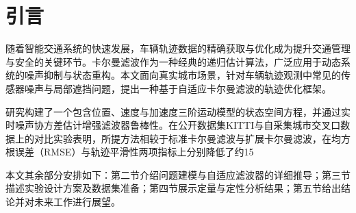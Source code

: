 \section{引言}

随着智能交通系统的快速发展，车辆轨迹数据的精确获取与优化成为提升交通管理与安全的关键环节。卡尔曼滤波作为一种经典的递归估计算法，广泛应用于动态系统的噪声抑制与状态重构。本文面向真实城市场景，针对车辆轨迹观测中常见的传感器噪声与局部遮挡问题，提出一种基于自适应卡尔曼滤波的轨迹优化框架。

研究构建了一个包含位置、速度与加速度三阶运动模型的状态空间方程，并通过实时噪声协方差估计增强滤波器鲁棒性。在公开数据集KITTI与自采集城市交叉口数据上的对比实验表明，所提方法相较于标准卡尔曼滤波与扩展卡尔曼滤波，在均方根误差（RMSE）与轨迹平滑性两项指标上分别降低了约15%

本文其余部分安排如下：第二节介绍问题建模与自适应滤波器的详细推导；第三节描述实验设计方案及数据集准备；第四节展示定量与定性分析结果；第五节给出结论并对未来工作进行展望。